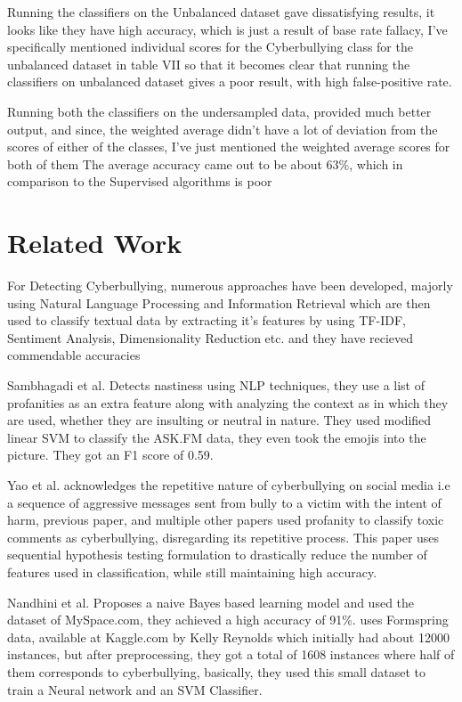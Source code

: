 \documentclass[10pt,conference]{IEEEtran}
\begin{document}
Running the classifiers on the Unbalanced dataset gave dissatisfying results,  it looks like they have high accuracy, which is just a result of base rate fallacy, I’ve specifically mentioned individual scores for the Cyberbullying class for the unbalanced dataset in table VII so that it becomes clear that running the classifiers on unbalanced dataset gives a poor result, with high false-positive rate.

Running both the classifiers on the undersampled data, provided much better output, and since, the weighted average didn’t have a lot of deviation from the scores of either of the classes, I’ve just mentioned the weighted average scores for both of them
The average accuracy came out to be about 63\%, which in comparison to the Supervised algorithms is poor


\section{Related Work}
For Detecting Cyberbullying, numerous approaches have been developed, majorly using Natural Language Processing and Information Retrieval which are then used to classify textual data by extracting it's features by using TF-IDF, Sentiment Analysis, Dimensionality Reduction etc. and they have recieved commendable accuracies

Sambhagadi et al.\cite{b5} Detects nastiness using NLP techniques, they use a list of profanities as an extra feature along with analyzing the context as in which they are used, whether they are insulting or neutral in nature. They used modified linear SVM to classify the ASK.FM data, they even took the emojis into the picture. They got an F1 score of 0.59. 

Yao et al.\cite{b6} acknowledges the repetitive nature of cyberbullying on social media i.e a sequence of aggressive messages sent from bully to a victim with the intent of harm, previous paper, and multiple other papers used profanity to classify toxic comments as cyberbullying, disregarding its repetitive process. This paper uses sequential hypothesis testing formulation to drastically reduce the number of features used in classification, while still maintaining high accuracy.

Nandhini et al.\cite{b7} Proposes a naive Bayes based learning model and used the dataset of MySpace.com, they achieved a high accuracy of 91\%. \cite{b8} uses Formspring data, available at Kaggle.com by Kelly Reynolds which initially had about 12000 instances, but after preprocessing, they got a total of 1608 instances where half of them corresponds to cyberbullying, basically, they used this small dataset to train a Neural network and an SVM Classifier.
\end{document}
